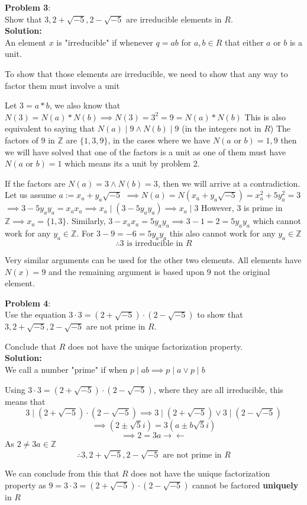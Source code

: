 \documentclass[11pt]{article}
\newcommand{\prob}[3]{\begin{flushleft}
        \textbf{Problem #1}: \\
        #2 
		\textbf{Solution:} 
		#3

\end{flushleft}}
\begin{document}
\prob{3}{
    Show that $3,2+ \sqrt{-5}, 2 - \sqrt{-5}$ are irreducible elements in $R$. \\
}{ \\
    An element $x$ is "irreducible" if whenever $q = ab$ for $a, b \in R$ that either $a$ or $b$ is a unit.

    To show that those elements are irreducible, we need to show that any way to factor them must involve a unit

    Let $3 = a*b$, we also know that $N(3) = N(a)*N(b) \implies N(3) = 3^2 = 9 = N(a)*N(b)$
    This is also equivalent to saying that $N(a) \mid 9 \land N(b) \mid 9$ (in the integers not in $R$)
    The factors of $9$ in $\mathbb{Z}$ are $\{ 1, 3, 9 \}$, in the cases where we have $N(a \text{ or } b) = 1, 9$ then we will
    have solved that one of the factors is a unit as one of them must have $N(a \text{ or } b) = 1$ which means its a unit by problem 2.

    If the factors are $N(a) = 3 \land N(b) = 3$, then we will arrive at a contradiction. Let us assume $a := x_a + y_a\sqrt{-5}$
    $\implies N(a) = N(x_a + y_a\sqrt{-5}) = x_a^2 + 5y_a^2 = 3$
    $\implies 3 - 5y_a y_a = x_a x_a \implies x_a \mid (3 - 5 y_a y_a) \implies x_a \mid 3$
    However, $3$ is prime in $\mathbb{Z} \implies x_a = \{ 1, 3 \}$.
    Similarly, $3 - x_a x_a = 5 y_a y_a \implies 3 - 1 = 2 = 5 y_a y_a$ which cannot work for any $y_a \in \mathbb{Z}$.
    For $3 - 9 = -6 = 5 y_a y_a$ this also cannot work for any $y_a \in \mathbb{Z}$
    $$\therefore \text{$3$ is irreducible in $R$}$$

    Very similar arguments can be used for the other two elements. All elements have $N(x) = 9$ and the remaining argument is based upon $9$ not the original element.
}

\prob{4}{
    Use the equation $3 \cdot 3 = (2 + \sqrt{-5}) \cdot (2 - \sqrt{-5})$ to show that $3, 2 + \sqrt{-5}, 2 - \sqrt{-5}$ are not prime in $R$.

    Conclude that $R$ does not have the unique factorization property. \\
}{ \\
    We call a number "prime" if when $p \mid ab \implies p \mid a \lor p \mid b$

    Using $3 \cdot 3 = (2 + \sqrt{-5}) \cdot (2 - \sqrt{-5})$, where they are all irreducible, this means that
    $$3 \mid (2 + \sqrt{-5}) \cdot (2 - \sqrt{-5}) \implies 3 \mid (2 + \sqrt{-5}) \lor 3 \mid (2 - \sqrt{-5})$$
    $$\implies (2 \pm \sqrt{5}i) = 3(a \pm b\sqrt{5}i)$$
    $$\implies 2 = 3a \rightarrow\leftarrow$$
    As $2 \neq 3a \in \mathbb{Z}$
    $$\therefore \text{$3, 2 + \sqrt{-5}, 2 - \sqrt{-5}$ are not prime in $R$}$$

    We can conclude from this that $R$ does not have the unique factorization property as
    $9 = 3 \cdot 3 = (2 + \sqrt{-5}) \cdot (2 - \sqrt{-5})$ cannot be factored \textbf{uniquely} in $R$
}
\end{document}
